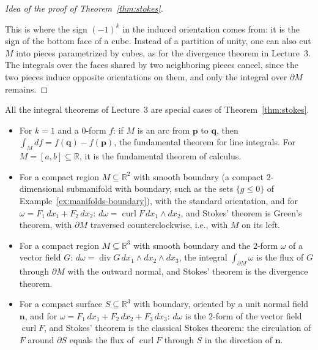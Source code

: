 \documentclass[11pt]{article}
\theoremstyle{definition}
\theoremstyle{plain}
\theoremstyle{remark}
\DeclareMathOperator{\Div}{div}
\DeclareMathOperator{\curl}{curl}
\begin{document}
\begin{proof}[Idea of the proof of Theorem~\ref{thm:stokes}]
\begin{enumerate}
    \end{enumerate}
    This is where the sign $(-1)^k$ in the induced orientation comes from: it is the sign of the bottom face of a cube. Instead of a partition of unity, one can also cut $M$ into pieces parametrized by cubes, as for the divergence theorem in Lecture~3. The integrals over the faces shared by two neighboring pieces cancel, since the two pieces induce opposite orientations on them, and only the integral over $\partial M$ remains.
\end{proof}

All the integral theorems of Lecture~3 are special cases of Theorem~\ref{thm:stokes}.
\begin{itemize}
    \item For $k = 1$ and a $0$-form $f$: if $M$ is an arc from $\mathbf{p}$ to $\mathbf{q}$, then $\int_M df = f(\mathbf{q}) - f(\mathbf{p})$, the fundamental theorem for line integrals. For $M = [a, b] \subseteq \mathbb{R}$, it is the fundamental theorem of calculus.
    \item For a compact region $M \subseteq \mathbb{R}^2$ with smooth boundary (a compact $2$-dimensional submanifold with boundary, such as the sets $\{g \leq 0\}$ of Example~\ref{ex:manifolds-boundary}), with the standard orientation, and for $\omega = F_1\, dx_1 + F_2\, dx_2$: $d\omega = \curl F\, dx_1 \wedge dx_2$, and Stokes' theorem is Green's theorem, with $\partial M$ traversed counterclockwise, i.e., with $M$ on its left.
    \item For a compact region $M \subseteq \mathbb{R}^3$ with smooth boundary and the $2$-form $\omega$ of a vector field $G$: $d\omega = \Div G\, dx_1 \wedge dx_2 \wedge dx_3$, the integral $\int_{\partial M} \omega$ is the flux of $G$ through $\partial M$ with the outward normal, and Stokes' theorem is the divergence theorem.
    \item For a compact surface $S \subseteq \mathbb{R}^3$ with boundary, oriented by a unit normal field $\mathbf{n}$, and for $\omega = F_1\, dx_1 + F_2\, dx_2 + F_3\, dx_3$: $d\omega$ is the $2$-form of the vector field $\curl F$, and Stokes' theorem is the classical Stokes theorem: the circulation of $F$ around $\partial S$ equals the flux of $\curl F$ through $S$ in the direction of $\mathbf{n}$.
\end{itemize}
\end{document}
